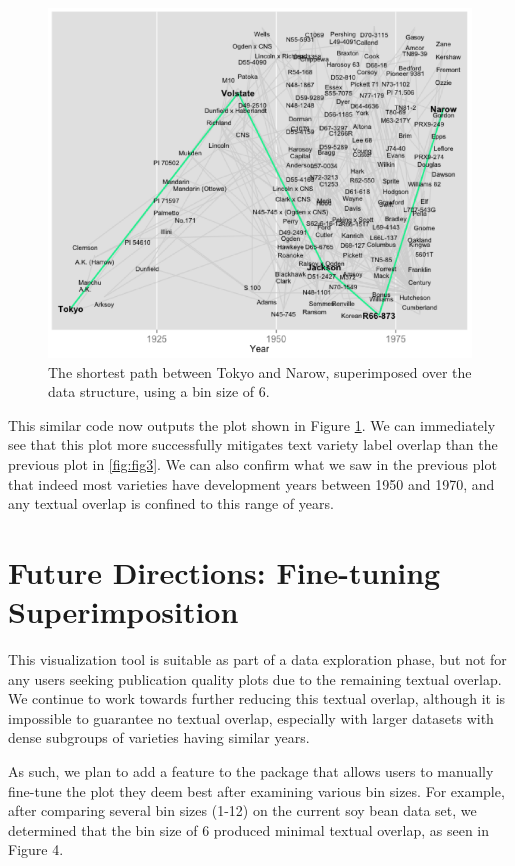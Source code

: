 \documentclass[article,shortnames]{jss}
\begin{document}
\begin{figure}%
    \centering
    \includegraphics[width=\textwidth]{fig4}
    \caption{The shortest path between Tokyo and Narow, superimposed over the data structure, using a bin size of 6.}
    \label{fig:fig4}
\end{figure}

This similar code now outputs the plot shown in Figure \ref{fig:fig4}. We can immediately see that this plot more successfully mitigates text variety label overlap than the previous plot in \ref{fig:fig3}. We can also confirm what we saw in the previous plot that indeed most varieties have development years between 1950 and 1970, and any textual overlap is confined to this range of years.

\section{Future Directions: Fine-tuning Superimposition}

This visualization tool is suitable as part of a data exploration phase, but not for any users seeking publication quality plots due to the remaining textual overlap. We continue to work towards further reducing this textual overlap, although it is impossible to guarantee no textual overlap, especially with larger datasets with dense subgroups of varieties having similar years.

As such, we plan to add a feature to the  package that allows users to manually fine-tune the plot they deem best after examining various bin sizes. For example, after comparing several bin sizes (1-12) on the current soy bean data set, we determined that the bin size of 6 produced minimal textual overlap, as seen in Figure 4.
\end{document}
